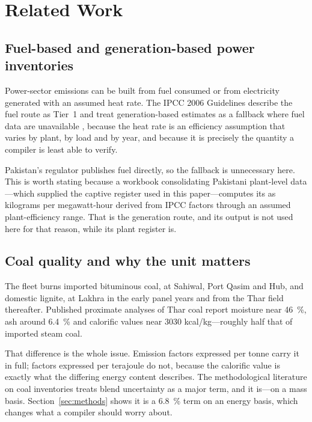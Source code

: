 \section{Related Work}
\label{sec:related}

\subsection{Fuel-based and generation-based power inventories}

Power-sector emissions can be built from fuel consumed or from electricity generated with an
assumed heat rate. The IPCC 2006 Guidelines describe the fuel route as Tier~1 and treat
generation-based estimates as a fallback where fuel data are unavailable \citep{ipcc2006stationary},
because the heat rate is an efficiency assumption that varies by plant, by load and by year,
and because it is precisely the quantity a compiler is least able to verify.

Pakistan's regulator publishes fuel directly, so the fallback is unnecessary here. This is
worth stating because a workbook consolidating Pakistani plant-level data---which supplied the
captive register used in this paper---computes its \COtwo{} as kilograms per megawatt-hour
derived from IPCC factors through an assumed plant-efficiency range. That is the generation
route, and its output is not used here for that reason, while its plant register is.

\subsection{Coal quality and why the unit matters}

The fleet burns imported bituminous coal, at Sahiwal, Port Qasim and Hub, and domestic
lignite, at Lakhra in the early panel years and from the Thar field thereafter. Published proximate analyses of Thar coal report moisture near
\SI{46}{\percent}, ash around \SI{6.4}{\percent} and calorific values near
\SI{3030}{} kcal/kg---roughly half that of imported steam coal.

That difference is the whole issue. Emission factors expressed per tonne carry it in full;
factors expressed per terajoule do not, because the calorific value is exactly what the
differing energy content describes. The methodological literature on coal inventories treats
blend uncertainty as a major term, and it is---on a mass basis. Section~\ref{sec:methods}
shows it is a \SI{6.8}{\percent} term on an energy basis, which changes what a compiler should
worry about.

